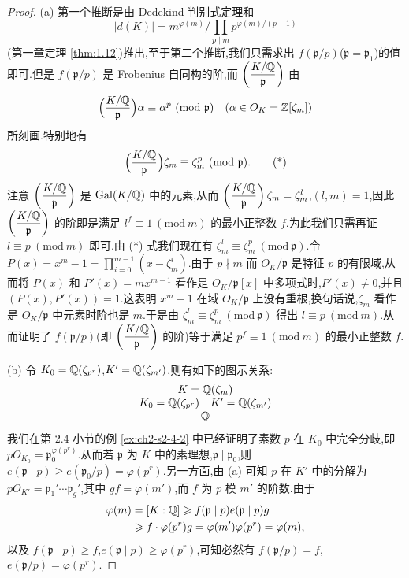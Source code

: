 \begin{proof}
(a) 第一个推断是由 Dedekind 判别式定理和
\[
  |d(K)|=m^{\varphi(m)}\Big/\prod_{p\mid m}p^{\varphi(m)/(p-1)}
\]
(第一章定理 \ref{thm:1.12})推出,至于第二个推断,我们只需求出 $f(\mathfrak{p}/p)$($\mathfrak{p}=\mathfrak{p}_1$)的值即可.但是 $f(\mathfrak{p}/p)$ 是 Frobenius 自同构的阶,而 $\left(\dfrac{K/\mathbb{Q}}{\mathfrak{p}}\right)$ 由
\[
  \Big(\frac{K/\Q}{\mathfrak{p}}\Big)\alpha\equiv\alpha^p\ (\mathrm{mod}\ \mathfrak{p})\quad (\alpha\in O_K=\Z[\zeta_m])
\]
所刻画.特别地有
\begin{equation}  \Big(\frac{K/\Q}{\mathfrak{p}}\Big)\zeta_m\equiv\zeta_m^p\ (\mathrm{mod}\ \mathfrak{p}).\tag{*}\end{equation}
注意 $\left(\dfrac{K/\mathbb{Q}}{\mathfrak{p}}\right)$ 是 $\operatorname{Gal}(K/\mathbb{Q})$ 中的元素,从而 $\left(\dfrac{K/\mathbb{Q}}{\mathfrak{p}}\right)\zeta_m=\zeta_m^l$,$(l,m)=1$,因此 $\left(\dfrac{K/\mathbb{Q}}{\mathfrak{p}}\right)$ 的阶即是满足 $l^f\equiv 1\ (\mathrm{mod}\ m)$ 的最小正整数 $f$.为此我们只需再证 $l\equiv p\ (\mathrm{mod}\ m)$ 即可.由 (*) 式我们现在有 $\zeta_m^l\equiv\zeta_m^p\ (\mathrm{mod}\ \mathfrak{p})$.令 $P(x)=x^m-1=\prod_{i=0}^{m-1}(x-\zeta_m^i)$.由于 $p\nmid m$ 而 $O_K/\mathfrak{p}$ 是特征 $p$ 的有限域,从而将 $P(x)$ 和 $P'(x)=mx^{m-1}$ 看作是 $O_K/\mathfrak{p}[x]$ 中多项式时,$P'(x)\neq 0$,并且 $(P(x),P'(x))=1$.这表明 $x^m-1$ 在域 $O_K/\mathfrak{p}$ 上没有重根,换句话说,$\zeta_m$ 看作是 $O_K/\mathfrak{p}$ 中元素时阶也是 $m$.于是由 $\zeta_m^l\equiv\zeta_m^p\ (\mathrm{mod}\ \mathfrak{p})$ 得出 $l\equiv p\ (\mathrm{mod}\ m)$.从而证明了 $f(\mathfrak{p}/p)$(即 $\left(\dfrac{K/\mathbb{Q}}{\mathfrak{p}}\right)$ 的阶)等于满足 $p^f\equiv 1\ (\mathrm{mod}\ m)$ 的最小正整数 $f$.

(b) 令 $K_0=\mathbb{Q}(\zeta_{p^r})$,$K'=\mathbb{Q}(\zeta_{m'})$,则有如下的图示关系:
\[
  \begin{array}{c}
    K=\mathbb{Q}(\zeta_m)\\
    K_0=\mathbb{Q}(\zeta_{p^r})\quad K'=\mathbb{Q}(\zeta_{m'})\\
    \mathbb{Q}
  \end{array}
\]
我们在第 2.4 小节的例 \ref{ex:ch2-s2-4-2} 中已经证明了素数 $p$ 在 $K_0$ 中完全分歧,即 $pO_{K_0}=\mathfrak{p}_0^{\varphi(p^r)}$.从而若 $\mathfrak{p}$ 为 $K$ 中的素理想,$\mathfrak{p}\mid\mathfrak{p}_0$,则 $e(\mathfrak{p}\mid p)\geqslant e(\mathfrak{p}_0/p)=\varphi(p^r)$.另一方面,由 (a) 可知 $p$ 在 $K'$ 中的分解为 $pO_{K'}=\mathfrak{p}_1'\cdots\mathfrak{p}_g'$,其中 $gf=\varphi(m')$,而 $f$ 为 $p$ 模 $m'$ 的阶数.由于
\begin{align*}
  \varphi(m)&=[K:\mathbb{Q}]\geqslant f(\mathfrak{p}\mid p)e(\mathfrak{p}\mid p)g\\
  &\geqslant f\cdot\varphi(p^r)g=\varphi(m')\varphi(p^r)=\varphi(m),
\end{align*}
以及 $f(\mathfrak{p}\mid p)\geqslant f$,$e(\mathfrak{p}\mid p)\geqslant\varphi(p^r)$,可知必然有 $f(\mathfrak{p}/p)=f$,$e(\mathfrak{p}/p)=\varphi(p^r)$.
\end{proof}

